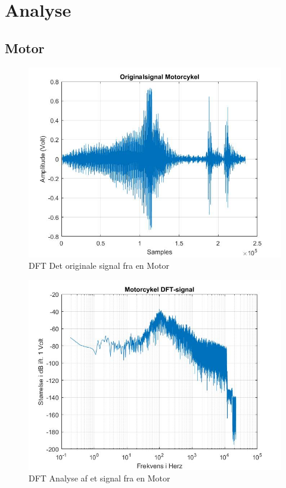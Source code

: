 \chapter{Analyse}\label{ch:analyse}



\section{Motor}

\begin{figure}[ht!]
	\centering
	\includegraphics[width=180mm]{figures/Motor/original.jpg}
	\caption{DFT Det originale signal fra en Motor}
	\label{fig:Motor original}
\end{figure}

\begin{figure}[ht!]
	\centering
	\includegraphics[width=180mm]{figures/Motor/DFT.jpg}
	\caption{DFT Analyse af et signal fra en Motor}
	\label{fig:Motor DFT}
\end{figure}

